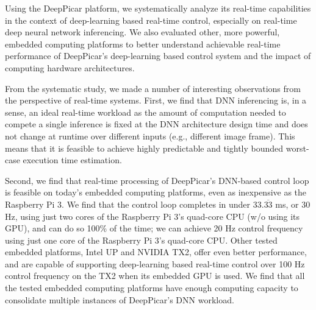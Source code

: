 Using the DeepPicar platform, we systematically analyze its real-time
capabilities in the context of deep-learning based real-time
control, especially on real-time deep neural network inferencing.
We also evaluated other, more powerful, embedded computing
platforms to better understand achievable real-time performance of
DeepPicar's deep-learning based control system and the impact of
computing hardware architectures.

%
%
%
%
%
%
From the systematic study, we made a number of interesting
observations from the perspective of real-time systems.
First, we find that DNN inferencing is, in a sense, an ideal real-time
workload as the amount of computation needed to compete a single
inference is fixed at the DNN architecture design time and does not
change at runtime over different inputs (e.g., different image frame).
This means that it is feasible to achieve highly predictable and
tightly bounded worst-case execution time estimation.

Second, we find that real-time processing of DeepPicar's DNN-based
control loop is feasible on today's embedded computing platforms, even 
as inexpensive as the Raspberry Pi 3. We find that the control loop 
completes in under 33.$\overline{\mbox{33}}$ ms, or 30 Hz, using just two 
cores of the Raspberry Pi 3's quad-core CPU (w/o using its GPU), and can
do so 100\% of the time; we can achieve 20 Hz control frequency using
just one core of the Raspberry Pi 3's quad-core CPU.
Other tested embedded platforms, Intel UP and NVIDIA TX2, offer even
better performance, and are capable of supporting deep-learning based 
real-time control over 100 Hz control frequency on the TX2 when its
embedded GPU is used.
We find that all the tested embedded computing platforms have 
enough computing capacity to consolidate multiple instances of
DeepPicar's DNN workload.

